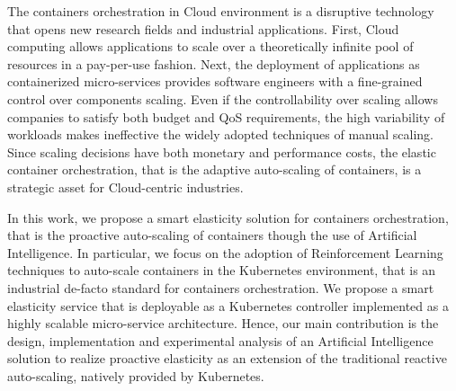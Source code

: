 The containers orchestration in Cloud environment is a disruptive technology that opens new research fields and industrial applications.
%
First, Cloud computing allows applications to scale over a theoretically infinite pool of resources in a pay-per-use fashion.
%
Next, the deployment of applications as containerized micro-services provides software engineers with a fine-grained control over components scaling.
%
Even if the controllability over scaling allows companies to satisfy both budget and QoS requirements, the high variability of workloads makes ineffective the widely adopted techniques of manual scaling.
%
Since scaling decisions have both monetary and performance costs, the elastic container orchestration, that is the adaptive auto-scaling of containers, is a strategic asset for Cloud-centric industries.


In this work, we propose a smart elasticity solution for containers orchestration, that is the proactive auto-scaling of containers though the use of Artificial Intelligence.
%
In particular, we focus on the adoption of Reinforcement Learning techniques to auto-scale containers in the Kubernetes environment, that is an industrial de-facto standard for containers orchestration.
%
We propose a smart elasticity service that is deployable as a Kubernetes controller implemented as a highly scalable micro-service architecture.
%
Hence, our main contribution is the design, implementation and experimental analysis of an Artificial Intelligence solution to realize proactive elasticity as an extension of the traditional reactive auto-scaling, natively provided by Kubernetes.

%
%
%
%

